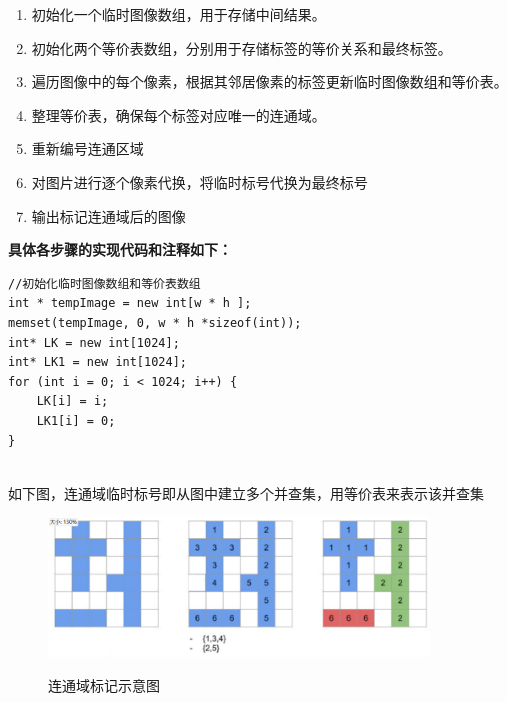 \documentclass[12pt,hyperref,a4paper,UTF8]{ctexart}
\begin{document}
\begin{enumerate}
    \item 初始化一个临时图像数组，用于存储中间结果。
    \item 初始化两个等价表数组，分别用于存储标签的等价关系和最终标签。
    \item 遍历图像中的每个像素，根据其邻居像素的标签更新临时图像数组和等价表。
    \item 整理等价表，确保每个标签对应唯一的连通域。
    \item 重新编号连通区域
    \item 对图片进行逐个像素代换，将临时标号代换为最终标号
    \item 输出标记连通域后的图像
\end{enumerate}



        \textbf{具体各步骤的实现代码和注释如下：}
        \begin{lstlisting}[caption={开运算和闭运算函数}, label={lst:example}]
//初始化临时图像数组和等价表数组
int * tempImage = new int[w * h ]; 
memset(tempImage, 0, w * h *sizeof(int));
int* LK = new int[1024];      
int* LK1 = new int[1024];     
for (int i = 0; i < 1024; i++) {
    LK[i] = i; 
    LK1[i] = 0;
}
            
        \end{lstlisting}

如下图，连通域临时标号即从图中建立多个并查集，用等价表来表示该并查集
\begin{figure}[H]
    \centering
    \caption{连通域标记示意图}
    \includegraphics[width=0.9\textwidth]{./figures/fig/image5.png}
    \label{fig:your_image_label}
\end{figure}
\end{document}
